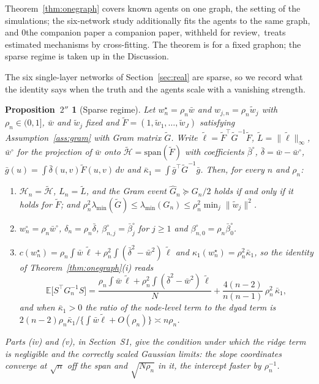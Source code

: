 \documentclass[12pt]{article}
\newcommand{\blind}{0}
\newcommand{\E}{\mathbb{E}}
\newcommand{\calH}{\mathcal{H}}
\newcommand{\supn}[1]{\|#1\|_{\infty}}
\newcommand{\norm}[1]{\|#1\|}
\newcommand{\wstar}{w^{\star}}
\newtheorem*{propsparse}{Proposition~$2''$}
\begin{document}
Theorem~\ref{thm:onegraph} covers known agents on one graph, the setting of the simulations; the six-network study additionally fits the agents to the same graph, and \blind the companion paper \citep{PapamichalisRuane2026minimax}\else a companion paper, withheld for review,\fi\ treats estimated mechanisms by cross-fitting. The theorem is for a fixed graphon; the sparse regime is taken up in the Discussion.

The six single-layer networks of Section~\ref{sec:real} are sparse, so we record what the identity says when the truth and the agents scale with a vanishing strength.

\begin{propsparse}[Sparse regime]
\label{prop:sparse}
Let $\wstar_n=\rho_n\bar w$ and $w_{j,n}=\rho_n\tilde w_j$ with $\rho_n\in(0,1]$, $\bar w$ and $\tilde w_j$ fixed and $\tilde F=(1,\tilde w_1,\dots,\tilde w_J)$ satisfying Assumption~\ref{ass:gram} with Gram matrix $\tilde G$. Write $\tilde\ell=\tilde F^{\top}\tilde G^{-1}\tilde F$, $\tilde L=\supn{\tilde\ell}$, $\bar w^{\circ}$ for the projection of $\bar w$ onto $\tilde{\calH}=\mathrm{span}(\tilde F)$ with coefficients $\bar\beta^{\circ}$, $\bar\delta=\bar w-\bar w^{\circ}$, $\bar g(u)=\int\bar\delta(u,v)\tilde F(u,v)\,dv$ and $\bar\kappa_1=\int\bar g^{\top}\tilde G^{-1}\bar g$. Then, for every $n$ and $\rho_n$:
\begin{enumerate}
\item[(i)] $\calH_n=\tilde{\calH}$, $L_n=\tilde L$, and the Gram event $\hat G_n\succeq G_n/2$ holds if and only if it holds for $\tilde F$; and $\rho_n^2\lambda_{\min}(\tilde G)\le\lambda_{\min}(G_n)\le\rho_n^2\min_j\norm{\tilde w_j}^2$.
\item[(ii)] $w^{\circ}_n=\rho_n\bar w^{\circ}$, $\delta_n=\rho_n\bar\delta$, $\beta^{\circ}_{n,j}=\bar\beta^{\circ}_j$ for $j\ge1$ and $\beta^{\circ}_{n,0}=\rho_n\bar\beta^{\circ}_0$.
\item[(iii)] $c(\wstar_n)=\rho_n\int\bar w\,\tilde\ell+\rho_n^2\int(\bar\delta^2-\bar w^2)\,\tilde\ell$ and $\kappa_1(\wstar_n)=\rho_n^2\bar\kappa_1$, so the identity of Theorem~\ref{thm:onegraph}(i) reads
\[
\E\big[S^{\top}G_n^{-1}S\big]=\frac{\rho_n\!\int\bar w\,\tilde\ell+\rho_n^2\!\int(\bar\delta^2-\bar w^2)\,\tilde\ell}{N}+\frac{4(n-2)}{n(n-1)}\,\rho_n^2\,\bar\kappa_1 ,
\]
and when $\bar\kappa_1>0$ the ratio of the node-level term to the dyad term is $2(n-2)\rho_n\bar\kappa_1/\{\int\bar w\tilde\ell+O(\rho_n)\}\asymp n\rho_n$.
\end{enumerate}
Parts (iv) and (v), in Section~S1, give the condition under which the ridge term is negligible and the correctly scaled Gaussian limits: the slope coordinates converge at $\sqrt n$ off the span and $\sqrt{N\rho_n}$ in it, the intercept faster by $\rho_n^{-1}$.

\end{propsparse}
\end{document}
